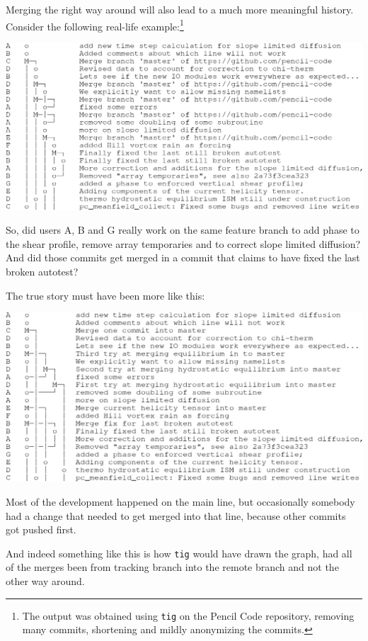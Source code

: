 \documentclass[12pt,pdftex]{article}
\begin{document}
\bigskip

Merging the right way around will also lead to a much more meaningful history.
Consider the following real-life example:\footnote{The output was obtained using \texttt{tig} on the Pencil Code repository,
removing many commits, shortening and mildly anonymizing the commits.}

\includegraphics[width=.97\linewidth]{git-wrong-history.pdf}

So, did users A, B and G really work on the same feature branch to add
phase to the shear profile, remove array temporaries and to correct
slope limited diffusion?
And did those commits get merged in a commit that claims to have fixed
the last broken autotest?

The true story must have been more like this:

\includegraphics[width=.97\linewidth]{git-better-history.pdf}

Most of the development happened on the main line, but occasionally
somebody had a change that needed to get merged into that line, because
other commits got pushed first.

And indeed something like this is how \texttt{tig} would have drawn the graph,
had all of the merges been from tracking branch into the remote branch
and not the other way around.
\end{document}
